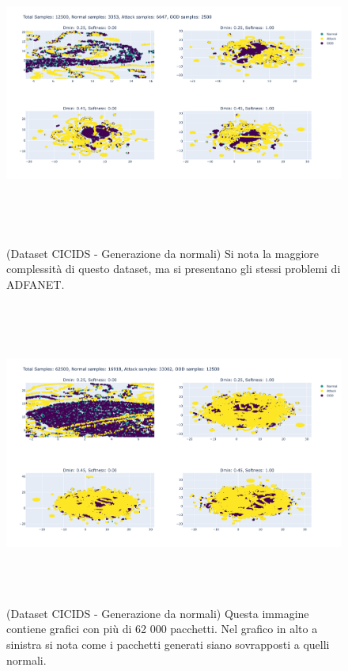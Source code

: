 \begin{figure}[htpb]
    \centering
    \includegraphics[width=\textwidth,height=10cm,keepaspectratio=true]{img/gen_test/cicids/CICIDS18_normal_only_25p_ood.png}
    \caption{
      (Dataset CICIDS - Generazione da normali) Si nota la maggiore complessità di questo dataset, ma si presentano gli stessi problemi di ADFANET.
    }
    \label{fig:gen_CICIDS_norm_1}
\end{figure}


\begin{figure}[htpb]
    \centering
    \includegraphics[width=\textwidth,height=10cm,keepaspectratio=true]{img/gen_test/cicids/CICIDS18_normal_only_12k_ood.png}
    \caption{
      (Dataset CICIDS - Generazione da normali) Questa immagine contiene grafici con più di 62 000 pacchetti. Nel grafico in alto a sinistra si nota come i pacchetti generati siano sovrapposti a quelli normali.
    }
    \label{fig:gen_CICIDS_norm_2}
\end{figure}


